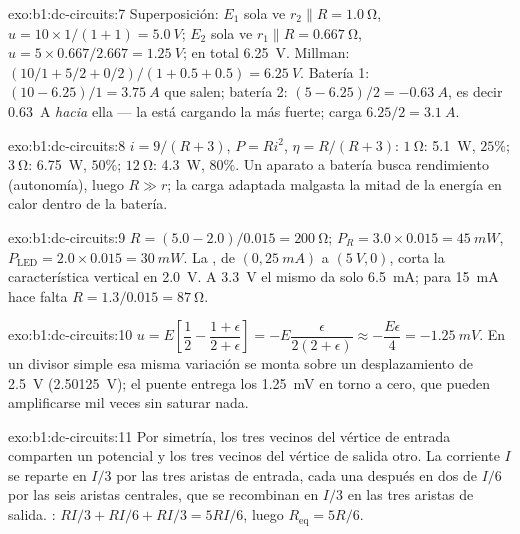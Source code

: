 \begin{solution}{exo:b1:dc-circuits:7}
Superposición: $E_1$ sola ve $r_2 \parallel R = \qty{1.0}{\ohm}$,
$u = 10 \times 1/(1 + 1) = \qty{5.0}{V}$; $E_2$ sola ve $r_1 \parallel R
= \qty{0.667}{\ohm}$, $u = 5 \times 0.667/2.667 = \qty{1.25}{V}$; en total
\qty{6.25}{V}. Millman: $(10/1 + 5/2 + 0/2)/(1 + 0.5 + 0.5) = \qty{6.25}{V}$.
Batería 1: $(10 - 6.25)/1 = \qty{3.75}{A}$ que salen; batería 2: $(5 - 6.25)/2
= \qty{-0.63}{A}$, es decir \qty{0.63}{A} \emph{hacia} ella --- la está
cargando la más fuerte; carga $6.25/2 = \qty{3.1}{A}$.
\end{solution}

\begin{solution}{exo:b1:dc-circuits:8}
$i = 9/(R + 3)$, $P = Ri^2$, $\eta = R/(R + 3)$: $\qty{1}{\ohm}$:
\qty{5.1}{W}, $25\%$; $\qty{3}{\ohm}$: \qty{6.75}{W}, $50\%$;
$\qty{12}{\ohm}$: \qty{4.3}{W}, $80\%$. Un aparato a batería busca
rendimiento (autonomía), luego $R \gg r$; la carga adaptada malgasta la
mitad de la energía en calor dentro de la batería.
\end{solution}

\begin{solution}{exo:b1:dc-circuits:9}
$R = (5.0 - 2.0)/0.015 = \qty{200}{\ohm}$; $P_R = 3.0 \times 0.015 =
\qty{45}{mW}$, $P_{\mathrm{LED}} = 2.0 \times 0.015 = \qty{30}{mW}$. La
, de $(0, \qty{25}{mA})$ a $(\qty{5}{V}, 0)$, corta la
característica vertical en \qty{2.0}{V}. A \qty{3.3}{V} el mismo 
da solo \qty{6.5}{mA}; para \qty{15}{mA} hace falta $R = 1.3/0.015 =
\qty{87}{\ohm}$.
\end{solution}

\begin{solution}{exo:b1:dc-circuits:10}
$u = E\left[\dfrac12 - \dfrac{1 + \epsilon}{2 + \epsilon}\right] =
-E\dfrac{\epsilon}{2(2 + \epsilon)} \approx -\dfrac{E\epsilon}{4} =
\qty{-1.25}{mV}$. En un divisor simple esa misma variación se monta sobre
un desplazamiento de \qty{2.5}{V} (\qty{2.50125}{V}); el puente entrega
los \qty{1.25}{mV} en torno a cero, que pueden amplificarse mil veces sin
saturar nada.
\end{solution}

\begin{solution}{exo:b1:dc-circuits:11}
Por simetría, los tres vecinos del vértice de entrada comparten un
potencial y los tres vecinos del vértice de salida otro. La corriente
$I$ se reparte en $I/3$ por las tres aristas de entrada, cada una después
en dos de $I/6$ por las seis aristas centrales, que se recombinan en $I/3$
en las tres aristas de salida. : $RI/3 + RI/6 + RI/3 = 5RI/6$, luego
$R_{\mathrm{eq}} = 5R/6$.
\end{solution}

